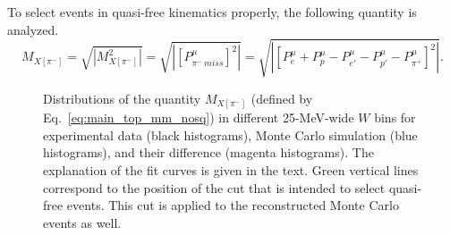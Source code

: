 To select events in quasi-free kinematics properly, the following quantity is analyzed.%
\begin{equation}
 M_{X[\pi^{-}]}=\sqrt{|M_{X[\pi^{-}]}^{2}|}=\sqrt{|[P_{\pi^{-}~miss}^{\mu}]^{2}|}=\sqrt{|[P_{e}^{\mu} + P_{p}^{\mu}- P_{e'}^{\mu}- P_{p'}^{\mu}-  P_{\pi^{+}}^{\mu}]^{2}|}.\label{eq:main_top_mm_nosq}
\end{equation}\vspace{-1em}

\begin{figure}[!ht]
\begin{center}
\end{center}
\caption{\small Distributions of the quantity $M_{X[\pi^{-}]}$ (defined by  Eq.~\eqref{eq:main_top_mm_nosq}) in different 25-MeV-wide $W$ bins for experimental data (black histograms), Monte Carlo simulation (blue histograms), and their difference (magenta histograms). The explanation of the fit curves is given in the text. Green vertical lines correspond to the position of the cut that is intended to select quasi-free events. This cut is applied to the reconstructed Monte Carlo events as well.}
\label{fig:main_top_mm_fsi_corr}
\end{figure}
\clearpage

